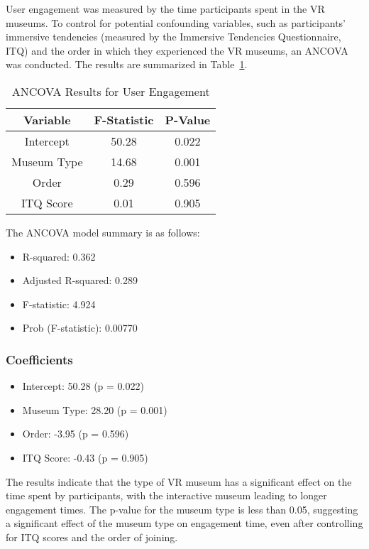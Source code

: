 \documentclass[conference]{IEEEtran}
\begin{document}
User engagement was measured by the time participants spent in the VR museums. To control for potential confounding variables, such as participants' immersive tendencies (measured by the Immersive Tendencies Questionnaire, ITQ) and the order in which they experienced the VR museums, an ANCOVA was conducted. The results are summarized in Table~\ref{tab:ancova}.

\begin{table}[h]
\centering
\caption{ANCOVA Results for User Engagement}
\begin{tabular}{|c|c|c|}
\hline
\textbf{Variable} & \textbf{F-Statistic} & \textbf{P-Value} \\
\hline
Intercept & 50.28 & 0.022 \\
Museum Type & 14.68 & 0.001 \\
Order & 0.29 & 0.596 \\
ITQ Score & 0.01 & 0.905 \\
\hline
\end{tabular}
\label{tab:ancova}
\end{table}

\noindent The ANCOVA model summary is as follows:

\begin{itemize}
    \item R-squared: 0.362
    \item Adjusted R-squared: 0.289
    \item F-statistic: 4.924
    \item Prob (F-statistic): 0.00770
\end{itemize}

\subsubsection*{Coefficients}

\begin{itemize}
    \item Intercept: 50.28 (p = 0.022)
    \item Museum Type: 28.20 (p = 0.001)
    \item Order: -3.95 (p = 0.596)
    \item ITQ Score: -0.43 (p = 0.905)
\end{itemize}

The results indicate that the type of VR museum has a significant effect on the time spent by participants, with the interactive museum leading to longer engagement times. The p-value for the museum type is less than 0.05, suggesting a significant effect of the museum type on engagement time, even after controlling for ITQ scores and the order of joining.
\end{document}
